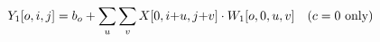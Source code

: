 \documentclass[preview]{standalone}
\begin{document}
\begin{align*}
\special{dvisvgm:raw <g id='unique000'>}Y_1[o,i,j]=b_o+\sum_{u}\sum_{v}X[0,i{+}u,j{+}v]\cdot W_1[o,0,u,v]\quad(c=0\text{ only})\special{dvisvgm:raw </g>}
\end{align*}
\end{document}
